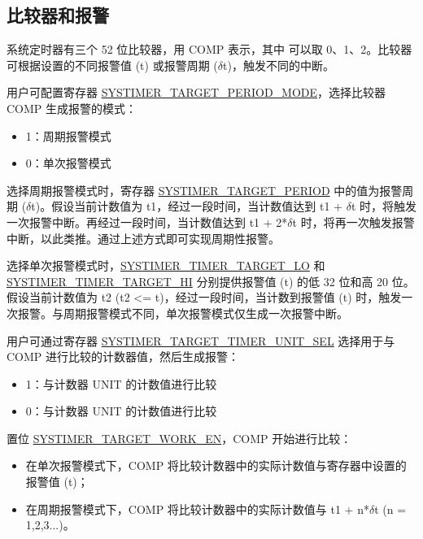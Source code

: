 \documentclass[main\_\_CN.tex]{subfiles}
\begin{document}
\subsection{比较器和报警}
系统定时器有三个 52 位比较器，用 COMP 表示，其中  可以取 0、1、2。比较器可根据设置的不同报警值 (t) 或报警周期 ($\delta$t)，触发不同的中断。

用户可配置寄存器 \hyperref[fielddesc:SYSTIMERTARGET0PERIODMODE]{SYSTIMER\_TARGET\_PERIOD\_MODE}，选择比较器 COMP 生成报警的模式：
\begin{itemize}
    \item 1：周期报警模式
    \item 0：单次报警模式
\end{itemize}

选择周期报警模式时，寄存器 \hyperref[fielddesc:SYSTIMERTARGET2PERIOD]{SYSTIMER\_TARGET\_PERIOD} 中的值为报警周期 ($\delta$t)。假设当前计数值为 t1，经过一段时间，当计数值达到 t1 + $\delta$t 时，将触发一次报警中断。再经过一段时间，当计数值达到 t1 + 2*$\delta$t 时，将再一次触发报警中断，以此类推。通过上述方式即可实现周期性报警。

选择单次报警模式时，\hyperref[fielddesc:SYSTIMERTIMERTARGET0LO]{SYSTIMER\_TIMER\_TARGET\_LO} 和 \hyperref[fielddesc:SYSTIMERTIMERTARGET0HI]{SYSTIMER\_TIMER\_TARGET\_HI} 分别提供报警值 (t) 的低 32 位和高 20 位。假设当前计数值为 t2 (t2 <= t)，经过一段时间，当计数到报警值 (t) 时，触发一次报警。与周期报警模式不同，单次报警模式仅生成一次报警中断。

用户可通过寄存器 \hyperref[fielddesc:SYSTIMERTARGET0TIMERUNITSEL]{SYSTIMER\_TARGET\_TIMER\_UNIT\_SEL} 选择用于与 COMP 进行比较的计数器值，然后生成报警：

\begin{itemize}
        \item 1：与计数器 UNIT 的计数值进行比较
        \item 0：与计数器 UNIT 的计数值进行比较
\end{itemize}

置位 \hyperref[fielddesc:SYSTIMERTARGET0WORKEN]{SYSTIMER\_TARGET\_WORK\_EN}，COMP 开始进行比较：
\begin{itemize}
    \item 在单次报警模式下，COMP 将比较计数器中的实际计数值与寄存器中设置的报警值 (t)；
    \item 在周期报警模式下，COMP 将比较计数器中的实际计数值与 t1 + n*$\delta$t (n = 1,2,3...)。
\end{itemize}
\end{document}
